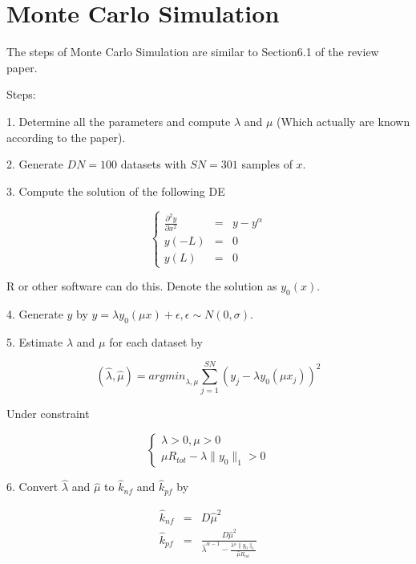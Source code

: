 \documentclass[12pt]{extarticle}
\begin{document}
\section{Monte Carlo Simulation}
\label{sect:MonteCarloSimulation}

The steps of Monte Carlo Simulation are similar to Section6.1 of the review paper.

Steps:

1. Determine all the parameters and compute $\lambda$ and $\mu$ (Which actually are known according to the paper).

2. Generate $DN=100$ datasets with $SN=301$ samples of $x$.

3. Compute the solution of the following DE

\begin{equation*}
\left\{
\begin{array}{rcl}
\frac{\partial^{2}y}{\partial{}x^{2}} & = & y-y^{\alpha} \\
y(-L) & = & 0 \\
y(L) & = & 0
\end{array}\right.
\end{equation*}

R or other software can do this. Denote the solution as $y_{0}(x)$.

4. Generate $y$ by $y=\lambda{}y_{0}(\mu{}x)+\epsilon{}, \epsilon{}\sim{}N(0,\sigma{})$.

5. Estimate $\lambda$ and $\mu$ for each dataset by 

\begin{equation*}
(\hat{\lambda},\hat{\mu})={argmin}_{\lambda,\mu}\sum_{j=1}^{SN}\left(y_{j}-\lambda{}y_{0}(\mu{}x_{j})\right)^2
\end{equation*}

Under constraint

\begin{equation*}
\left\{
\begin{array}{l}
\lambda>0, \mu>0 \\
\mu{}R_{tot}-\lambda{}\|y_{0}\|_{1}>0
\end{array}
\right.
\end{equation*}

6. Convert $\hat{\lambda}$ and $\hat{\mu}$ to $\hat{k}_{nf}$ and $\hat{k}_{pf}$ by

\begin{equation*}
\begin{array}{rcl}
\hat{k}_{nf} & = & D\hat{\mu}^2 \\
\hat{k}_{pf} & = & \frac{D\hat{\mu}^{2}}{\hat{\lambda}^{\alpha-1}-\frac{\lambda{}^{\alpha}\|y_{0}\|_{1}}{\hat{\mu}R_{tot}}}
\end{array}
\end{equation*}
\end{document}
